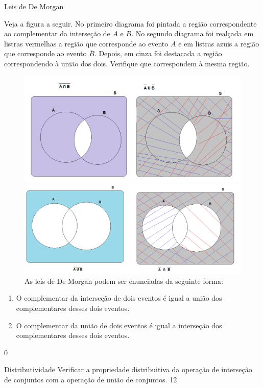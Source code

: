 \begin{answer}{Leis de De Morgan}
{
Veja a figura a seguir. No primeiro diagrama foi pintada a região correspondente ao complementar da interseção de $A$ e $B$. No segundo diagrama foi realçada em listras vermelhas a região que corresponde ao evento $\overline{A}$ e em listras azuis a região que corresponde ao evento $\overline{B}$. Depois, em cinza foi destacada a região correspondendo à união dos dois. Verifique que correspondem à mesma região.
\begin{figure}[H]
\centering

\includegraphics[width=\linewidth]{demorgan1.png}

\includegraphics[width=\linewidth]{demorgan2.png}
\caption{As leis de De Morgan podem ser enunciadas da seguinte forma:}
\label{}
\end{figure}

\begin{enumerate}
\item O complementar da interseção de dois eventos é igual a união dos complementares desses dois eventos.
\item O complementar da união de dois eventos é igual a interseção dos complementares desses dois eventos.
\end{enumerate}
}{0}
\end{answer}
\begin{objectives}{Distributividade}
{
Verificar a propriedade distribuitiva da operação de interseção de conjuntos com a operação de união de conjuntos.
}{1}{2}
\end{objectives}
